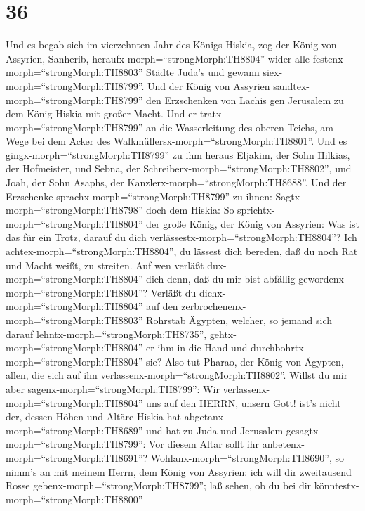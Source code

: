 \hypertarget{section-35}{%
\section{36}\label{section-35}}

 Und es begab sich im vierzehnten Jahr des Königs Hiskia,
zog der König von Assyrien, Sanherib,
heraufx-morph=``strongMorph:TH8804'' wider alle
festenx-morph=``strongMorph:TH8803'' Städte Juda's und gewann
siex-morph=``strongMorph:TH8799''.  Und der König von
Assyrien sandtex-morph=``strongMorph:TH8799'' den Erzschenken von Lachis
gen Jerusalem zu dem König Hiskia mit großer Macht. Und er
tratx-morph=``strongMorph:TH8799'' an die Wasserleitung des oberen
Teichs, am Wege bei dem Acker des
Walkmüllersx-morph=``strongMorph:TH8801''.  Und es
gingx-morph=``strongMorph:TH8799'' zu ihm heraus Eljakim, der Sohn
Hilkias, der Hofmeister, und Sebna, der
Schreiberx-morph=``strongMorph:TH8802'', und Joah, der Sohn Asaphs, der
Kanzlerx-morph=``strongMorph:TH8688''.  Und der Erzschenke
sprachx-morph=``strongMorph:TH8799'' zu ihnen:
Sagtx-morph=``strongMorph:TH8798'' doch dem Hiskia: So
sprichtx-morph=``strongMorph:TH8804'' der große König, der König von
Assyrien: Was ist das für ein Trotz, darauf du dich
verlässestx-morph=``strongMorph:TH8804''?  Ich
achtex-morph=``strongMorph:TH8804'', du lässest dich bereden, daß du
noch Rat und Macht weißt, zu streiten. Auf wen verläßt
dux-morph=``strongMorph:TH8804'' dich denn, daß du mir bist abfällig
gewordenx-morph=``strongMorph:TH8804''?  Verläßt du
dichx-morph=``strongMorph:TH8804'' auf den
zerbrochenenx-morph=``strongMorph:TH8803'' Rohrstab Ägypten, welcher, so
jemand sich darauf lehntx-morph=``strongMorph:TH8735'',
gehtx-morph=``strongMorph:TH8804'' er ihm in die Hand und
durchbohrtx-morph=``strongMorph:TH8804'' sie? Also tut Pharao, der König
von Ägypten, allen, die sich auf ihn
verlassenx-morph=``strongMorph:TH8802''.  Willst du mir aber
sagenx-morph=``strongMorph:TH8799'': Wir
verlassenx-morph=``strongMorph:TH8804'' uns auf den HERRN, unsern Gott!
ist's nicht der, dessen Höhen und Altäre Hiskia hat
abgetanx-morph=``strongMorph:TH8689'' und hat zu Juda und Jerusalem
gesagtx-morph=``strongMorph:TH8799'': Vor diesem Altar sollt ihr
anbetenx-morph=``strongMorph:TH8691''? 
Wohlanx-morph=``strongMorph:TH8690'', so nimm's an mit meinem Herrn, dem
König von Assyrien: ich will dir zweitausend Rosse
gebenx-morph=``strongMorph:TH8799''; laß sehen, ob du bei dir
könntestx-morph=``strongMorph:TH8800''
